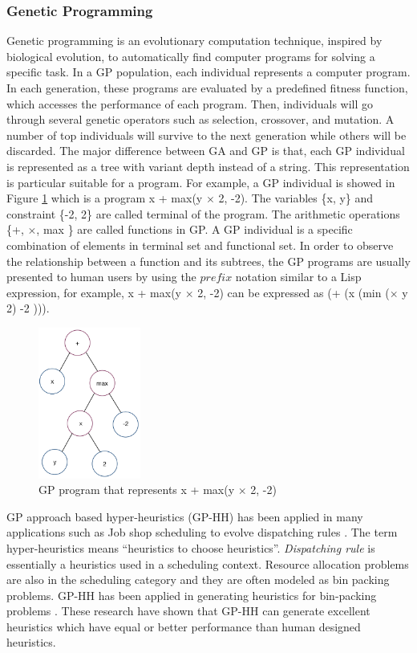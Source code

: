 \subsubsection{Genetic Programming}

Genetic programming \cite{1992gppc.book.....K} is an evolutionary computation technique, inspired by biological evolution, to automatically find 
computer programs for solving a specific task. In a GP population, each individual represents a computer program. In each generation, these programs are evaluated by a predefined fitness function, which accesses the performance of each program. Then, individuals will go through several genetic operators such as selection, crossover, and mutation. A number of top individuals will survive to the next generation while others will be discarded. The major difference between GA and GP is that, each GP individual is represented as a tree with variant depth instead of a string. This representation is particular suitable for a program. For example,  a GP individual is showed in Figure \ref{fig:gp_program} which is a program x + max(y $\times$ 2, -2). The variables \{x, y\} and constraint \{-2, 2\} are called terminal of the program. The arithmetic operations \{+, $\times$, max \} are called functions in GP. A GP individual is a specific combination of elements in terminal set and functional set. In order to observe the relationship between a function and its subtrees, the GP programs are usually presented to human users by using the $prefix$ notation similar to a Lisp expression, for example, x + max(y $\times$ 2, -2) can be expressed as (+ (x (min ($\times$ y 2) -2 ))).

\begin{figure}
	\centering
	\includegraphics[width=0.3\textwidth]{pics/gp-tree.png}
	\caption{GP program that represents x + max(y $\times$ 2, -2)}
	\label{fig:gp_program}
\end{figure}


GP approach based hyper-heuristics (GP-HH)  has been applied in many applications such as Job shop scheduling to evolve dispatching rules \cite{Nguyen:2014eu}. The term hyper-heuristics \cite{Cowling:2000ek} means ``heuristics to choose heuristics''.
\emph{Dispatching rule} is essentially a heuristics \cite{Panwalkar:1977fw} used in a scheduling context. 
Resource allocation problems are also in the scheduling category and they are often modeled as bin packing problems. 
GP-HH has been applied in generating heuristics for bin-packing problems \cite{Poli:2007kt,Sim:2013fe,Burke:2012gs}. These research have shown that GP-HH can generate excellent heuristics which have equal or better performance than human designed heuristics.

